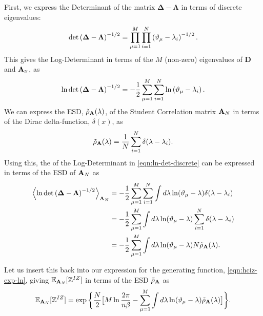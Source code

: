 First, we express the Determinant of the matrix $\mathbf{\Delta}-\mathbf{\Lambda}$ in terms of discrete eigenvalues:
\begin{equation}
\label{eqn:det-discrete}
    \det\left(\mathbf{\Delta}-\mathbf{\Lambda}\right)^{-1/2}=\prod_{\mu=1}^{M}\prod_{i=1}^{N}\left(\DeltaMu-\lambda_{i}\right)^{-1/2}  .
\end{equation}
%
This gives the Log-Determinant in terms of the $M$ (non-zero)
eigenvalues of $\mathbf{D}$ and ${\mathbf{A}}_{\text{\tiny N}}$, as
\begin{equation}
\label{eqn:ln-det-discrete}
    \ln\det\left(\mathbf{\Delta}-\mathbf{\Lambda}\right)^{-1/2}=-\dfrac{1}{2}\sum_{\mu=1}^{M}\sum_{i=1}^{N}\ln\left(\DeltaMu-\lambda_{i}\right)  .
\end{equation}
%
We can express %
the ESD, $\tilde\rho_{\mathbf{A}}(\lambda)$, of the 
Student Correlation 
matrix
$\mathbf{A}_N$ in terms of the Dirac delta-function, $\delta(x)$, as
\begin{equation}
\label{eqn:rho-emp}
    \tilde\rho_{\AMAT}(\lambda)=\frac{1}{N}\sum_{i=1}^{N}\delta(\lambda-\lambda_{i})  .
\end{equation}
Using this, the \ExpectedValue of the Log-Determinant 
in \ref{eqn:ln-det-discrete}
can be expressed in terms of the ESD of
$\mathbf{A}_N$ as
\begin{align}
\nonumber
\Expected[\AMAT_N]{\ln\det\left(\mathbf{\Delta}-\mathbf{\Lambda}\right)^{-1/2}}
   & = -\dfrac{1}{2}\sum_{\mu=1}^{M}\sum_{i=1}^{N}\int
       d\lambda\ln(\DeltaMu-\lambda)\delta(\lambda-\lambda_{i}) \\ 
\nonumber
   & = -\dfrac{1}{2}\sum_{\mu=1}^{M}\int
       d\lambda\ln(\DeltaMu-\lambda)\sum_{i=1}^{N}\delta(\lambda-\lambda_{i}) \\ 
\label{eqn:ln-det-rho}
   & = -\dfrac{1}{2}\sum_{\mu=1}^{M}\int
       d\lambda\ln(\DeltaMu-\lambda)
       N\tilde\rho_{\AMAT}(\lambda)  .
\end{align}

Let us insert this back into our
expression for the generating function,
\ref{eqn:hciz-exp-ln},   %
giving
$\mathbb{E}_{\mathbf{A}_{N}}[\mathbb{Z}^{IZ}]$ in terms of the ESD $\tilde{\rho}_{\mathbf{A}}$ as
\begin{equation}
\label{eqn:Z-rho}
    \EZDATWO=\exp\bigg\{\dfrac{N}{2}\big[M\ln\dfrac{2\pi}{\ND\beta}-\sum_{\mu=1}^{M}\int
        d\lambda\ln(\DeltaMu-\lambda)\tilde{\rho}_{\AMAT}(\lambda)\big]\bigg\}  .
\end{equation}


